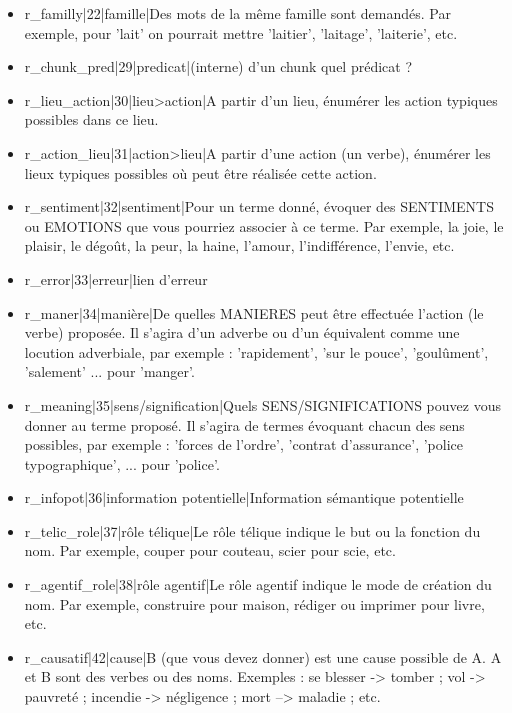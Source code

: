 \documentclass[a4paper,11pt,french]{article}
\begin{document}
\begin{itemize}
\item r\_familly|22|famille|Des mots de la même famille sont demandés. Par exemple, pour 'lait' on pourrait mettre 'laitier', 'laitage', 'laiterie', etc.

\item r\_chunk\_pred|29|predicat|(interne) d'un chunk quel prédicat ?

\item r\_lieu\_action|30|lieu>action|A partir d'un lieu, énumérer les action typiques possibles dans ce lieu.

\item r\_action\_lieu|31|action>lieu|A partir d'une action (un verbe), énumérer les lieux typiques possibles où peut être réalisée cette action.

\item r\_sentiment|32|sentiment|Pour un terme donné, évoquer des SENTIMENTS ou EMOTIONS que vous pourriez associer à ce terme. Par exemple, la joie, le plaisir, le dégoût, la peur, la haine, l'amour, l'indifférence, l'envie, etc.

\item r\_error|33|erreur|lien d'erreur

\item r\_maner|34|manière|De quelles MANIERES peut être effectuée l'action (le verbe) proposée. Il s'agira d'un adverbe ou d'un équivalent comme une locution adverbiale, par exemple : 'rapidement', 'sur le pouce', 'goulûment', 'salement' ... pour 'manger'.

\item r\_meaning|35|sens/signification|Quels SENS/SIGNIFICATIONS pouvez vous donner au terme proposé. Il s'agira de termes évoquant chacun des sens possibles, par exemple : 'forces de l'ordre', 'contrat d'assurance', 'police typographique', ... pour 'police'.

\item r\_infopot|36|information potentielle|Information sémantique potentielle

\item r\_telic\_role|37|rôle télique|Le rôle télique indique le but ou la fonction du nom. Par exemple, couper pour couteau, scier pour scie, etc.

\item r\_agentif\_role|38|rôle agentif|Le rôle agentif indique le mode de création du nom. Par exemple, construire pour maison, rédiger ou imprimer pour livre, etc.

\item r\_causatif|42|cause|B (que vous devez donner) est une cause possible de A. A et B sont des verbes ou des noms.  Exemples : se blesser -> tomber ; vol -> pauvreté ; incendie -> négligence ; mort --> maladie ; etc.


\end{itemize}
\end{document}
